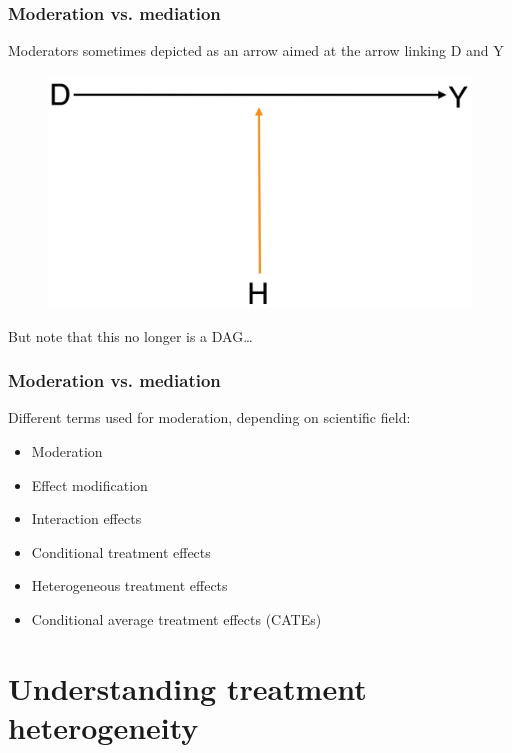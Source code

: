 \documentclass[12pt,english,dvipsnames,aspectratio=169,handout]{beamer}\usepackage[]{graphicx}\usepackage[]{xcolor}
\begin{document}
\begin{frame}
  \frametitle{Moderation vs. mediation}
\footnotesize
Moderators sometimes depicted as an arrow aimed at the arrow linking D and Y

	 \begin{figure} 
    \includegraphics[height=.3\textheight,keepaspectratio=true]{../04-figures/10/03-w10_moderator_informal}
    \end{figure}
    
But note that this no longer is a DAG\ldots

\vspace{1cm}
\end{frame}


\begin{frame}
  \frametitle{Moderation vs. mediation}
\footnotesize

Different terms used for moderation, depending on scientific field:

\begin{itemize}\footnotesize
  \item Moderation
  \item Effect modification
  \item Interaction effects
  \item Conditional treatment effects
  \item Heterogeneous treatment effects
  \item Conditional average treatment effects (CATEs)
\end{itemize}

\vspace{1cm}
\end{frame}


\section{Understanding treatment heterogeneity}
\end{document}
